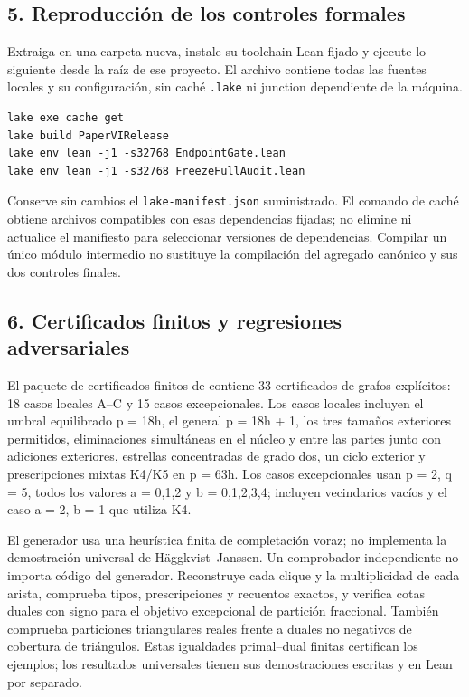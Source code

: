 \documentclass[spanish,11pt,a4paper]{article}
\begin{document}
\subsection{5. Reproducción de los controles
formales}\label{reproducciuxf3n-de-los-controles-formales}

Extraiga
en una carpeta nueva, instale su toolchain Lean fijado y ejecute lo
siguiente desde la raíz de ese proyecto. El archivo contiene todas las
fuentes locales y su configuración, sin caché \texttt{.lake} ni junction
dependiente de la máquina.

\begin{verbatim}
lake exe cache get
lake build PaperVIRelease
lake env lean -j1 -s32768 EndpointGate.lean
lake env lean -j1 -s32768 FreezeFullAudit.lean
\end{verbatim}

Conserve sin cambios el \texttt{lake-manifest.json} suministrado. El
comando de caché obtiene archivos compatibles con esas dependencias
fijadas; no elimine ni actualice el manifiesto para seleccionar
versiones de dependencias. Compilar un único módulo intermedio no
sustituye la compilación del agregado canónico y sus dos controles
finales.

\subsection{6. Certificados finitos y regresiones
adversariales}\label{certificados-finitos-y-regresiones-adversariales}

El paquete de certificados finitos de 
contiene 33 certificados de grafos explícitos: 18 casos locales A--C y
15 casos excepcionales. Los casos locales incluyen el umbral equilibrado
p = 18h, el general p = 18h + 1, los tres tamaños exteriores permitidos,
eliminaciones simultáneas en el núcleo y entre las partes junto con
adiciones exteriores, estrellas concentradas de grado dos, un ciclo
exterior y prescripciones mixtas K4/K5 en p = 63h. Los casos
excepcionales usan p = 2, q = 5, todos los valores a = 0,1,2 y b =
0,1,2,3,4; incluyen vecindarios vacíos y el caso a = 2, b = 1 que
utiliza K4.

El generador usa una heurística finita de completación voraz; no
implementa la demostración universal de Häggkvist--Janssen. Un
comprobador independiente no importa código del generador. Reconstruye
cada clique y la multiplicidad de cada arista, comprueba tipos,
prescripciones y recuentos exactos, y verifica cotas duales con signo
para el objetivo excepcional de partición fraccional. También comprueba
particiones triangulares reales frente a duales no negativos de
cobertura de triángulos. Estas igualdades primal--dual finitas
certifican los ejemplos; los resultados universales tienen sus
demostraciones escritas y en Lean por separado.
\end{document}
